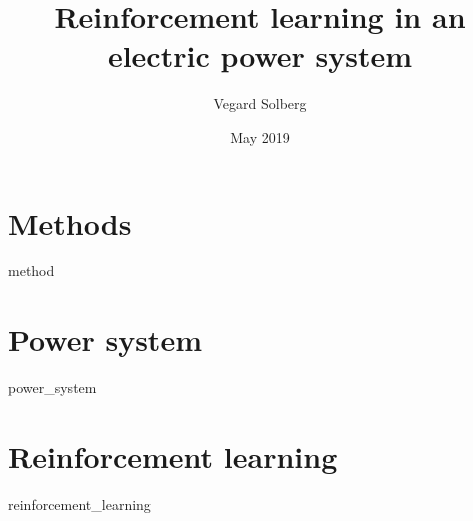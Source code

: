 \documentclass{book}
\title{Reinforcement learning in an electric power system}
\author{Vegard Solberg}
\date{May 2019}
\begin{document}
 
    \maketitle
    \tableofcontents
    
    \chapter{Methods}
    {method}

    
    \chapter{Power system}
    {power_system}
 
    \chapter{Reinforcement learning}
    {reinforcement_learning}
    
    \printbibliography
 
\end{document}
